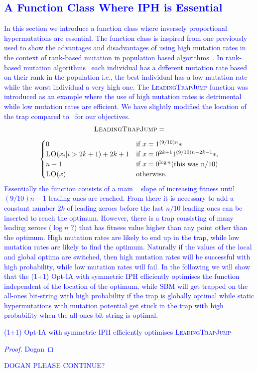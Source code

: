 \documentclass[lettersize,journal]{IEEEtran}
\newcommand{\new}[1]{\textcolor{blue}{#1}}
\begin{document}
\new{
\section{A Function Class Where IPH is Essential} 
In this section we introduce a function class where inversely proportional hypermutations are essential.
The function class is inspired from one previously used to show the advantages and disadvantages of using high mutation rates in the context of rank-based mutation in population based algorithms~\cite{OlivetoLehreNeumann09}.
In rank-based mutation algorithms~\cite{RankBasedMutation} each individual has a different mutation rate based on their rank in the population i.e., the best individual has a low mutation rate while the worst individual a very high one.
The \textsc{LeadingTrapJump} function was introduced as an example where the use of high mutation rates is detrimental while low mutation rates are efficient. We have slightly modified the location of the trap compared to~\cite{OlivetoLehreNeumann09} for our objectives.
\[
\textsc{LeadingTrapJump}  =
\]
\[
\begin{cases}
0 & \text{if } x = 1^{(9/10)n}* \\
\textsc{LO}(x_i | i>2k+1) + 2k+1 & \text{if } x = 0^{2k+1}1^{(9/10)n - 2k-1}*, \\
n-1 & \text{if } x = 0^{\log n}  \text{(this was n/10)}\\
\textsc{LO}(x) & \text{otherwise}.
\end{cases}
\]
 Essentially the function consists of a  main \leadingones~ slope of increasing fitness until $(9/10)n -1$ leading ones are reached. From there it is necessary to add a constant number $2k$ of leading zeroes before the last $n/10$ leading ones can be inserted to reach the optimum. However, there is a trap consisting of many leading zeroes ($\log n$ ?) that has fitness value higher than any point other than the optimum. High mutation rates are likely to end up in the trap, while low mutation rates are likely to find the optimum. Naturally  if the values of the local and global optima are switched, then high mutation rates will be successful with high probability, while low mutation rates will fail. In the following we will show that the (1+1) Opt-IA with symmetric IPH efficiently optimises the function independent of the location of the optimum, while SBM will get trapped on the all-ones bit-string with high probability if the trap is globally optimal while static hypermutations with mutation potential get stuck in the trap with high probability when the all-ones bit string is optimal.
 \begin{theorem}
 (1+1) Opt-IA with symmetric IPH efficiently optimises \textsc{LeadingTrapJump}
 \end{theorem}
 \begin{proof}
 Dogan
 \end{proof}
 DOGAN PLEASE CONTINUE?
}
\end{document}
